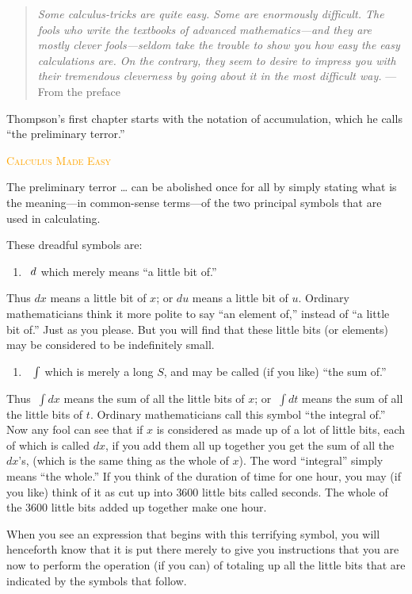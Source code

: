 \documentclass[
  letterpaper,
  DIV=11,
  numbers=noendperiod,
  oneside]{scrreprt}
\providecommand{\tightlist}{%
  \setlength{\itemsep}{0pt}\setlength{\parskip}{0pt}}
\newenvironment{madeeasy}%
{%
\textcolor{orange}{\hrulefill}%
  \par\vspace{.3\baselineskip}%
  \textcolor{orange}{\scshape Calculus Made Easy}%
  \par\vspace{\baselineskip}%
}%
{\textcolor{orange}{\hrulefill}}
\begin{document}
\begin{quote}
\emph{Some calculus-tricks are quite easy. Some are enormously
difficult. The fools who write the textbooks of advanced
mathematics---and they are mostly clever fools---seldom take the trouble
to show you how easy the easy calculations are. On the contrary, they
seem to desire to impress you with their tremendous cleverness by going
about it in the most difficult way.} --- From the preface
\end{quote}

Thompson's first chapter starts with the notation of accumulation, which
he calls ``the preliminary terror.''

\begin{madeeasy}
The preliminary terror \ldots{} can be abolished once for all by simply
stating what is the meaning---in common-sense terms---of the two
principal symbols that are used in calculating.

These dreadful symbols are:

\begin{enumerate}
\def\labelenumi{(\arabic{enumi})}
\tightlist
\item
  \(\Large\  d\) which merely means ``a little bit of.''
\end{enumerate}

Thus \(dx\) means a little bit of \(x\); or \(du\) means a little bit of
\(u\). Ordinary mathematicians think it more polite to say ``an element
of,'' instead of ``a little bit of.'' Just as you please. But you will
find that these little bits (or elements) may be considered to be
indefinitely small.

\begin{enumerate}
\def\labelenumi{(\arabic{enumi})}
\setcounter{enumi}{1}
\tightlist
\item
  \(\ \ \large\int\) which is merely a long \(S\), and may be called (if
  you like) ``the sum of.''
\end{enumerate}

Thus \(\ \int dx\) means the sum of all the little bits of \(x\); or
\(\ \int dt\) means the sum of all the little bits of \(t\). Ordinary
mathematicians call this symbol ``the integral of.'' Now any fool can
see that if \(x\) is considered as made up of a lot of little bits, each
of which is called \(dx\), if you add them all up together you get the
sum of all the \(dx\)'s, (which is the same thing as the whole of
\(x\)). The word ``integral'' simply means ``the whole.'' If you think
of the duration of time for one hour, you may (if you like) think of it
as cut up into \(3600\) little bits called seconds. The whole of the
\(3600\) little bits added up together make one hour.

When you see an expression that begins with this terrifying symbol, you
will henceforth know that it is put there merely to give you
instructions that you are now to perform the operation (if you can) of
totaling up all the little bits that are indicated by the symbols that
follow.

\end{madeeasy}
\end{document}
